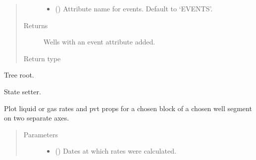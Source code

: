 \documentclass[letterpaper,10pt,english]{sphinxmanual}
\begin{document}
\begin{fulllineitems}
\begin{fulllineitems}
\begin{quote}
\begin{description}
\begin{itemize}
\item {} 
 (\sphinxstyleliteralemphasis{\sphinxupquote{, }}) \textendash{} Attribute name for events. Default to ‘EVENTS’.

\end{itemize}

\item[{Returns}] \leavevmode
{} \textendash{} Wells with an event attribute added.

\item[{Return type}] \leavevmode
{\hyperref[\detokenize{api/wells:geology.src.wells.Wells}]{}}

\end{description}\end{quote}

\end{fulllineitems}


\begin{fulllineitems}
\label{\detokenize{api/wells:geology.src.wells.Wells.root}}
Tree root.

\end{fulllineitems}


\begin{fulllineitems}
\label{\detokenize{api/wells:geology.src.wells.Wells.set_state}}
State setter.

\end{fulllineitems}


\begin{fulllineitems}
\label{\detokenize{api/wells:geology.src.wells.Wells.show_blocks_dynamics}}
Plot liquid or gas rates and pvt props for a chosen block of
a chosen well segment on two separate axes.
\begin{quote}\begin{description}
\item[{Parameters}] \leavevmode\begin{itemize}
\item {} 
 () \textendash{} Dates at which rates were calculated.


\end{itemize}
\end{description}
\end{quote}
\end{fulllineitems}
\end{fulllineitems}
\end{document}
